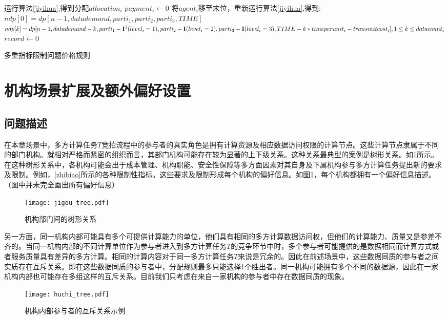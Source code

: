 \documentclass[promaster]{thesis-uestc}
\begin{document}
\begin{algorithm}[H]
    运行算法\ref{jiyihua},得到分配$allocation_i$\;
    {
        $payment_i \leftarrow 0$\;
        将$agent_i$移至末位，重新运行算法\ref{jiyihua},得到:\;
        $ndp[0] = dp[n-1,datademand,parti_1,parti_2,parti_3,TIME]$\;
        $ndp[k] = dp[n-1,datademand-k,parti_1-\mathbf{I\footnotemark}(level_i=1),parti_2-\mathbf{I}(level_i=2),parti_3-\mathbf{I}(level_i=3),TIME-k*timeperunit_i-transmitcost_i],1\leq k\leq datacount_i$\;
        $record \leftarrow 0$\;
    }
\caption{多重指标限制问题价格规则}
\label{dp_zhifu}
\end{algorithm}

\section{机构场景扩展及额外偏好设置}
\subsection{问题描述}
在本章场景中，多方计算任务$T$竞拍流程中的参与者的真实角色是拥有计算资源及相应数据访问权限的计算节点。这些计算节点隶属于不同的部门机构。就相对严格而紧密的组织而言，其部门机构可能存在较为显著的上下级关系。这种关系最典型的案例是树形关系。如\ref{jigoushu}所示。在这种树形关系中，各机构可能会出于成本管理、机构职能、安全性保障等多方面因素对其自身及下属机构参与多方计算任务提出新的要求及限制。例如，\ref{zhibiao}所示的各种限制性指标。这些要求及限制形成每个机构的偏好信息。如图\ref{jigoushu}，每个机构都拥有一个偏好信息描述。（图中并未完全画出所有偏好信息）

\begin{figure}[h]
\center
    \texttt{[image: jigou\_tree.pdf]}
    \caption{机构部门间的树形关系}
    \label{jigoushu}
\end{figure}

另一方面，同一机构内部可能具有多个可提供计算能力的单位，他们具有相同的多方计算数据访问权，但他们的计算能力、质量又是参差不齐的。当同一机构内部的不同计算单位作为参与者进入到多方计算任务$T$的竞争环节中时，多个参与者可能提供的是数据相同而计算方式或者服务质量具有差异的多方计算。相同的计算内容对于同一多方计算任务$T$来说是冗余的。因此在前述场景中，这些数据同质的参与者之间实质存在互斥关系。即在这些数据同质的参与者中，分配规则最多只能选择1个胜出者。同一机构可能拥有多个不同的数据源，因此在一家机构内部也可能存在多组这样的互斥关系。目前我们只考虑在来自一家机构的参与者中存在数据同质的现象。
\begin{figure}[h]
    \texttt{[image: huchi\_tree.pdf]}
    \caption{机构内部参与者的互斥关系示例}
    \label{huchishu}
\end{figure}
\end{document}
